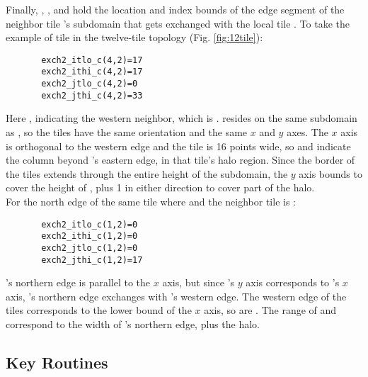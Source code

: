 Finally, ,
,
 and
 hold the location and index
bounds of the edge segment of the neighbor tile 's subdomain
that gets exchanged with the local tile .  To take the example
of tile  in the twelve-tile topology
(Fig. \ref{fig:12tile}): \\

\begin{verbatim}
       exch2_itlo_c(4,2)=17
       exch2_ithi_c(4,2)=17
       exch2_jtlo_c(4,2)=0
       exch2_jthi_c(4,2)=33
\end{verbatim}
 
Here , indicating the western neighbor, which is
.   resides on the same subdomain as , so
the tiles have the same orientation and the same $x$ and $y$ axes.
The $x$ axis is orthogonal to the western edge and the tile is 16
points wide, so  and 
indicate the column beyond 's eastern edge, in that tile's
halo region. Since the border of the tiles extends through the entire
height of the subdomain, the $y$ axis bounds  to
 cover the height of , plus 1 in
either direction to cover part of the halo. \\

For the north edge of the same tile  where  and 
the neighbor tile is :

\begin{verbatim}
       exch2_itlo_c(1,2)=0
       exch2_ithi_c(1,2)=0
       exch2_jtlo_c(1,2)=0
       exch2_jthi_c(1,2)=17
\end{verbatim}
 
's northern edge is parallel to the $x$ axis, but since
's $y$ axis corresponds to 's $x$ axis, 's
northern edge exchanges with 's western edge.  The western
edge of the tiles corresponds to the lower bound of the $x$ axis, so
  are . The range of
 and  correspond to the
width of 's northern edge, plus the halo. \\


\subsection{Key Routines}

